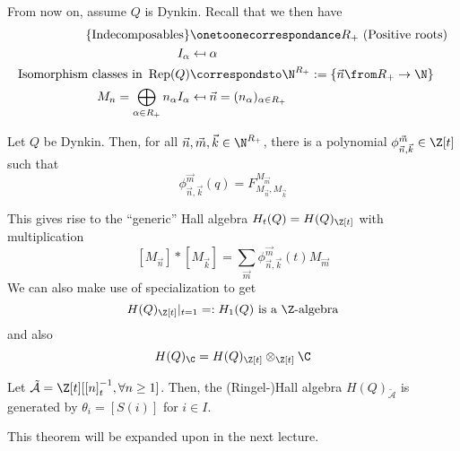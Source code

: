 \documentclass[11pt,leqno,oneside]{amsbook}
\numberwithin{thm}{section}
\newcommand{\Rep}{\operatorname{Rep}} %
\renewcommand{\Q}{Q} %
\newcommand\mapsfrom{\mathrel{\reflectbox{\ensuremath{\mapsto}}}}
\renewcommand{\roots}{R} %
\newcommand{\A}{\tilde{\mathcal{A}}}
\begin{document}
From now on, assume \(\Q\) is Dynkin. Recall that we then have
\begin{align*}
  \{\text{Indecomposables}\} & \onetoonecorrespondance \roots_+ \text{
                               (Positive roots)} \\
  I_\alpha & \mapsfrom \alpha \\
  \text{Isomorphism classes in } \Rep(\Q) & \correspondsto \N^{\roots_+} :=
                                            \{\vec{n} \from \roots_+ \to
                                            \N\} \\
  M_n = \bigoplus_{\alpha \in \roots_+} n_\alpha I_\alpha
  & \mapsfrom \vec{n} = (n_\alpha)_{\alpha \in \roots_+}
\end{align*}
\begin{prop}
  Let \(\Q\) be Dynkin. Then, for all \(\vec{n}, \vec{m}, \vec{k} \in
  \N^{\roots_+}\), there is a polynomial \(\phi_{\vec{n},\vec{k}}^{\vec{m}}
  \in \Z[t]\) such that \[
    \phi_{\vec{n},\vec{k}}^{\vec{m}}(q) = F_{M_{\vec{n}}, M_{\vec{k}}}^{M_{\vec{m}}}
  \]
\end{prop}
This gives rise to the ``generic'' Hall algebra \(H_t(\Q) =
H(\Q)_{\Z[t]}\) with multiplication \[
  [M_{\vec{n}}] * [M_{\vec{k}}] = \sum_{\vec{m}}
  \phi_{\vec{n},\vec{k}}^{\vec{m}}(t) M_{\vec{m}}
\]
We can also make use of specialization to get \[
  H(\Q)_{\Z[t]}|_{t=1} =: H_1(\Q) \text{ is a }\Z\text{-algebra}
\]
and also \[
  H(\Q)_\C = H(\Q)_{\Z[t]} \otimes_{\Z[t]} \C
\]
\begin{thm}\label{hall-alg-gen-by-thetas}
  Let \(\A = \Z[t][[n]_t^{-1}, \forall n \geq 1]\). Then, the
  (Ringel-)Hall algebra \(H(\Q)_{\A}\) is generated by \(\theta_i =
  [S(i)]\) for \(i \in I\). 
\end{thm}
This theorem will be expanded upon in the next lecture.
\end{document}
